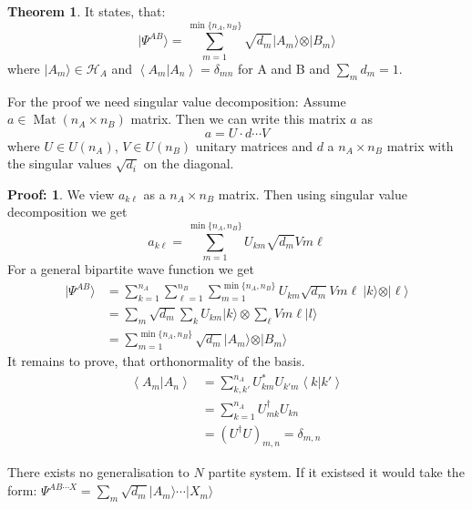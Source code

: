\documentclass[12pt]{book}
\theoremstyle{definition}
\newtheorem*{theo}{\bfseries Theorem}
\newtheorem*{prf}{Proof:}
\newcommand{\de}{\delta}
\newcommand{\scalar}[1]{\left\langle {#1}\right\rangle}
\let\oldsum\sum
\renewcommand{\sum}[2]{\oldsum\limits_{#1}^{#2}}
\newcommand{\ket}[1]{\vert {#1} \rangle}
\DeclareMathOperator{\mat}{Mat}
\begin{document}
\begin{theo}
It states, that:
\begin{equation}
  \ket{\Psi^{AB}} = \sum{m=1}{\min\{n_A, n_B\}} \sqrt{d_m} \ket{A_m} \otimes \ket{B_m}
\end{equation}
where $\ket{A_m} \in \mathcal H_A$ and $\scalar{A_m \vert A_{n}} = \de_{mn}$ for A and B and $\oldsum_m d_m = 1$.
\end{theo}

For the proof we need singular value decomposition: Assume $a \in \mat(n_A \times n_B)$ matrix. Then we can write this matrix $a$ as
\begin{equation*}
  a = U \cdot d \cdots V
\end{equation*}
where $U \in U(n_A)$, $V \in U(n_B)$ unitary matrices and $d$ a  $n_A \times n_B$ matrix with the singular values $\sqrt{d_i}$ on the diagonal.
\begin{prf}

We view $a_{k\ell}$ as a $n_A \times n_B$ matrix. Then using singular value decomposition we get
\begin{equation*}
  a_{k\ell} = \sum{m=1}{\min\{n_A, n_B\}} U_{km} \sqrt{d_m} V{m\ell}
\end{equation*}
For a general bipartite wave function we get
\begin{align*}
  \ket{\Psi^{AB}} & = \sum{k=1}{n_A} \sum{\ell=1}{n_B} \sum{m=1}{\min\{n_A, n_B\}} U_{km} \sqrt{d_m} V{m\ell}\: \ket{k} \otimes \ket{\ell} \\
  & = \oldsum_{m} \sqrt{d_m} \oldsum_k U_{km} \ket{k} \otimes \oldsum_\ell V{m\ell} \ket{l} \\
  & = \sum{m=1}{\min\{n_A, n_B\}} \sqrt{d_m} \ket{A_m} \otimes \ket{B_m}
\end{align*}
It remains to prove, that orthonormality of the basis.
\begin{align*}
  \scalar{A_m \vert A_n} & = \sum{k, k'}{n_A} U_{km}^* U_{k'm} \scalar{k \vert k'} \\
  & = \sum{k=1}{n_A} U^\dagger_{mk} U_{kn} \\
  & = (U^\dagger U)_{m, n} = \de_{m,n}
\end{align*}
\end{prf}
There exists no generalisation to $N$ partite system. If it existsed it would take the form: $\Psi^{AB\cdots X} = \oldsum_m \sqrt{d_m} \ket{A_m} \cdots \ket{X_m}$

\end{document}

